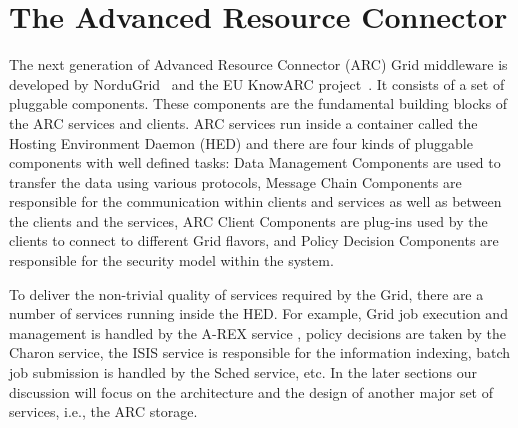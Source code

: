 \documentclass[final]{ieee}
\begin{document}






\section{The Advanced Resource Connector}
\label{The Advance Resource Connector}

The next generation of Advanced Resource Connector (ARC) Grid middleware is
developed by NorduGrid~\cite{NorduGridsite} and the EU KnowARC
 project~\cite{KnowARCsite}. It consists of a set of pluggable 
components. These components are the
fundamental building blocks of the ARC services and clients. ARC
services run inside a container called the Hosting Environment
Daemon (HED) and there are four kinds of pluggable components with well
defined tasks: Data Management Components are used to transfer the
data using various protocols, Message Chain Components are
responsible for the communication within clients and services as well as
between the clients and the services, ARC Client Components are
plug-ins used by the clients to connect to different Grid flavors, and
Policy Decision Components are responsible for the security model
within the system.

To deliver the non-trivial quality of services required by the Grid,
there are a number of services running inside the HED. For example, Grid
job execution and management is handled by the A-REX service 
\cite{AREXdesigndoc}, policy
decisions are taken by the Charon service, the ISIS service is
responsible for the information indexing, batch job submission is
handled by the Sched service, etc. In the later sections our discussion
will focus on the architecture and the design of another major set
of services, i.e., the ARC storage. 
\end{document}
